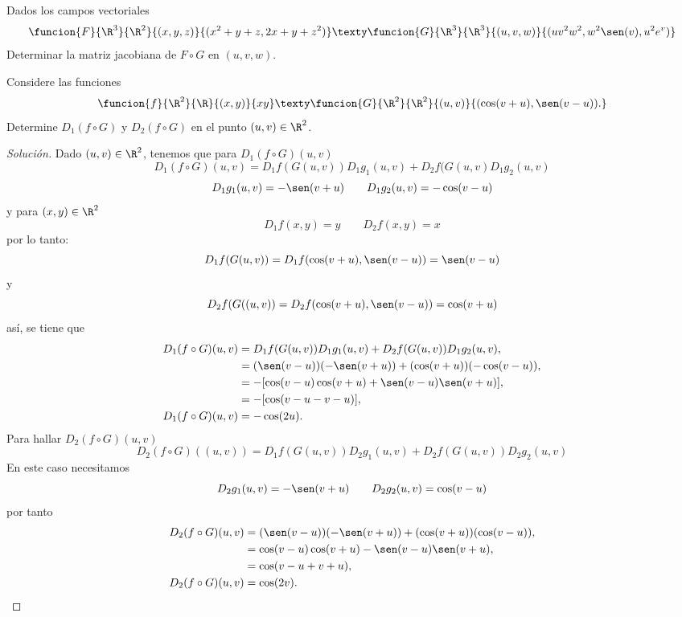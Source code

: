 \documentclass[a4,11pt]{aleph-notas}
\begin{document}
\encabezado

\begin{ejer}
Dados los campos vectoriales
    \[
        \funcion{F}{\R^3}{\R^2}{(x,y,z)}{(x^2+y+z,2x+y+z^2)}
        \texty
        \funcion{G}{\R^3}{\R^3}{(u,v,w)}{(uv^2w^2,w^2\sen(v),u^2e^v)}
    \]
    Determinar la matriz jacobiana de $F\circ G$ en $(u,v,w)$.
\end{ejer}

\begin{ejer}
Considere las funciones
	\[
 	    \funcion{f}{\R^2}{\R}{(x,y)}{xy}
 	    \texty 
 	    \funcion{G}{\R^2}{\R^2}{(u,v)}{(\cos(v+u),\sen(v-u)).}
    \]
	Determine $D_1(f\circ G)$ y $D_2(f\circ G)$ en el punto $(u,v)\in\R^2$.
\end{ejer}

\begin{proof}[Solución]
Dado $(u,v)\in\R^2$, tenemos que para $D_1(f\circ G)(u,v)$
	\[
	D_1(f\circ G)(u,v)=D_1f(G(u,v))D_1g_1(u,v)+D_2f(G(u,v)D_1g_2(u,v)
	        \]
		\[
	D_1g_1(u,v)=- \sen (v+u)\qquad  D_1g_2(u,v)=-\cos(v-u)
	        \]
    y para $(x,y)\in \R^2$
    	\[
	D_1f(x,y)=y\qquad D_2f(x,y)=x
	        \]
	por lo tanto:
		\[
	D_1f(G(u,v))=D_1f(\cos(v+u),\sen(v-u))=\sen(v-u)
	        \]
	y
	\[
	D_2f(G((u,v))=D_2f(\cos(v+u),\sen(v-u))=\cos(v+u)
	        \]
	así, se tiene que
    \begin{align*}
    D_1(f\circ G)(u,v)&=D_1f(G(u,v))D_1g_1(u,v)+D_2f(G(u,v))D_1g_2(u,v),\\
    &=(\sen(v-u))(-\sen(v+u))+(\cos(v+u))(-\cos(v-u)),\\
    &=-[\cos(v-u)\cos(v+u)+\sen(v-u)\sen(v+u)],\\
    &=-[\cos(v-u-v-u)],\\
    D_1(f\circ G)(u,v)&=-\cos(2u).
    \end{align*}
    Para hallar $D_2(f\circ G)(u,v)$
    \[
	D_2(f\circ G)((u,v))=D_1f(G(u,v))D_2g_1(u,v)+D_2f(G(u,v))D_2g_2(u,v)
	        \]
	En este caso necesitamos         
	\[
	D_2g_1(u,v)=-\sen(v+u)\qquad D_2g_2(u,v)=\cos(v-u)
	        \]
    por tanto
	 \begin{align*}
    D_2(f\circ G)(u,v)&=(\sen(v-u))(-\sen(v+u))+(\cos(v+u))(\cos(v-u)),\\
    &=\cos(v-u)\cos(v+u)-\sen(v-u)\sen(v+u),\\
    &=\cos(v-u+v+u),\\
    D_2(f\circ G)(u,v)&=\cos(2v).
    \end{align*}
\end{proof}
\end{document}
